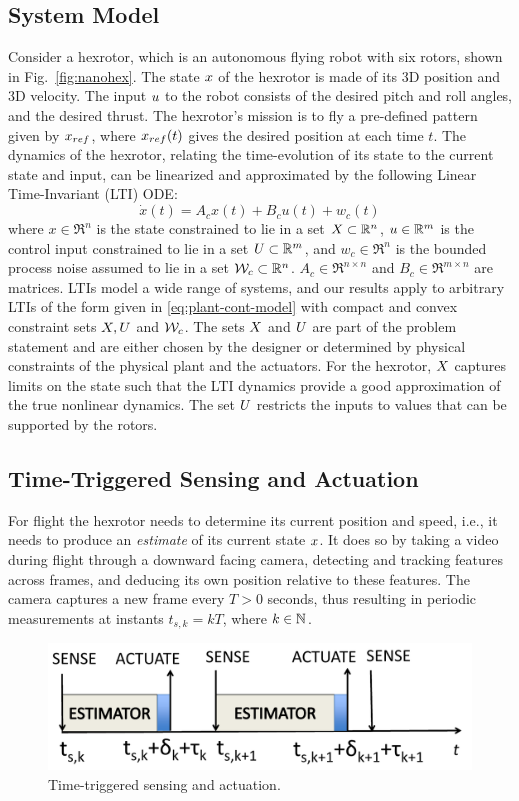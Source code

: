 \subsection{System Model}
\label{formulation}

Consider a hexrotor, which is an autonomous flying robot with six rotors, shown in Fig.~\ref{fig:nanohex}.
The state $x$ of the hexrotor is made of its 3D position and 3D velocity.
The input $u$ to the robot consists of the desired pitch and roll angles, and the desired thrust.
The hexrotor's mission is to fly a pre-defined pattern given by $x_{ref}$, where $x_{ref}(t)$ gives the desired position at each time $t$.
The dynamics of the hexrotor, relating the time-evolution of its state to the current state and input, can be linearized and approximated by the following Linear Time-Invariant (LTI) ODE:
\begin{equation}
\dot{x}(t) = A_{c}x(t)+B_{c}u(t)+w_{c}(t)  \label{eq:plant-cont-model}
\end{equation}
where $x\in \Re^{n}$ is the state constrained to lie in a set $X \subset \mathbb{R}^n$,
$u\in\mathbb{R}^{m}$ is the control input constrained to lie in a set $U \subset \mathbb{R}^m$,
and $w_{c}\in\Re^{n}$ is the bounded process noise assumed to lie in a set $\mathcal{W}_c \subset \mathbb{R}^n$.
$A_c \in \Re^{n\times n}$ and $B_c \in \Re^{m\times n}$ are matrices.
LTIs model a wide range of systems, and our results apply to arbitrary LTIs of the form given in \eqref{eq:plant-cont-model} with compact and convex constraint sets $X,U$ and $\mathcal{W}_c$.
The sets $X$ and $U$ are part of the problem statement and are either chosen by the designer or determined by physical constraints of the physical plant and the actuators.
For the hexrotor, $X$ captures limits on the state such that the LTI dynamics provide a good approximation of the true nonlinear dynamics.
The set $U$ restricts the inputs to values that can be supported by the rotors.

\subsection{Time-Triggered Sensing and Actuation}
For flight the hexrotor needs to determine its current position and speed, i.e., it needs to produce an \emph{estimate} of its current state $x$.
It does so by taking a video during flight through a downward facing camera, detecting and tracking features across frames, and deducing its own position relative to these features.
The camera captures a new frame every $T > 0$ seconds, thus resulting in periodic measurements at instants $t_{s,k}=kT$,
where $k\in\mathbb{N}$.
\begin{figure}[t]
\centering
\includegraphics[width=0.7\linewidth]{figures/senseActuate2_scissored}
\caption{Time-triggered sensing and actuation.}
\label{fig:senseActuate}
\end{figure}

